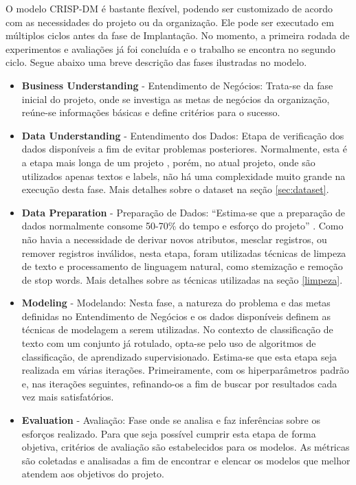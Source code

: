 O modelo CRISP-DM é bastante flexível, podendo ser customizado de acordo com as necessidades do projeto ou da organização. Ele pode ser executado em múltiplos ciclos antes da fase de Implantação. No momento, a primeira rodada de experimentos e avaliações já foi concluída e o trabalho se encontra no segundo ciclo. Segue abaixo uma breve descrição das fases ilustradas no modelo.

\begin{itemize}
    \item \textbf{Business Understanding} - Entendimento de Negócios: Trata-se da fase inicial do projeto, onde se investiga as metas de negócios da organização, reúne-se informações básicas e define critérios para o sucesso.
    \item \textbf{Data Understanding} - Entendimento dos Dados: Etapa de verificação dos dados disponíveis a fim de evitar problemas posteriores. Normalmente, esta é a etapa mais longa de um projeto \cite{crispdm}, porém, no atual projeto, onde são utilizados apenas textos e labels, não há uma complexidade muito grande na execução desta fase. Mais detalhes sobre o dataset na seção \ref{sec:dataset}.
    \item \textbf{Data Preparation} - Preparação de Dados: “Estima-se que a preparação de dados normalmente consome 50-70\% do tempo e esforço do projeto” \cite{crispdm}. Como não havia a necessidade de derivar novos atributos, mesclar registros, ou remover registros inválidos, nesta etapa, foram utilizadas técnicas de limpeza de texto e processamento de linguagem natural, como stemização e remoção de stop words. Mais detalhes sobre as técnicas utilizadas na seção \ref{limpeza}.
    \item \textbf{Modeling} - Modelando: Nesta fase, a natureza do problema e das metas definidas no Entendimento de Negócios e os dados disponíveis definem as técnicas de modelagem a serem utilizadas. No contexto de classificação de texto com um conjunto já rotulado, opta-se pelo uso de algoritmos de classificação, de aprendizado supervisionado. Estima-se que esta etapa seja realizada em várias iterações. Primeiramente, com os hiperparâmetros padrão e, nas iterações seguintes, refinando-os a fim de buscar por resultados cada vez mais satisfatórios.
    \item \textbf{Evaluation} - Avaliação: Fase onde se analisa e faz inferências sobre os esforços realizado. Para que seja possível cumprir esta etapa de forma objetiva, critérios de avaliação são estabelecidos para os modelos. As métricas são coletadas e analisadas a fim de encontrar e elencar os modelos que melhor atendem aos objetivos do projeto.

\end{itemize}
